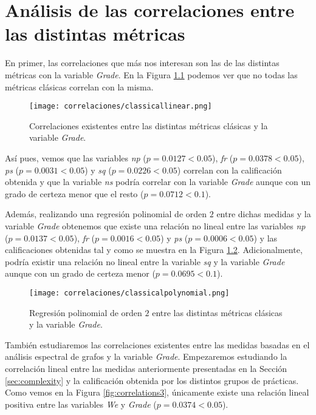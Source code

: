 \chapter{Análisis de las correlaciones entre las distintas métricas}\label{chapter:correlations}

En primer, las correlaciones que más nos interesan son las de las distintas métricas con la variable \emph{Grade}. En la Figura \ref{fig:correlations} podemos ver que no todas las métricas clásicas correlan con la misma.

\begin{figure}[H]
    \centering
    \texttt{[image: correlaciones/classicallinear.png]}
    \caption{Correlaciones existentes entre las distintas métricas clásicas y la variable \emph{Grade}.}
    \label{fig:correlations}
\end{figure}

Así pues, vemos que las variables \emph{np} ($p = 0.0127 < 0.05$), \emph{fr} ($p = 0.0378 < 0.05$), \emph{ps} ($p = 0.0031 < 0.05$) y \emph{sq} ($p = 0.0226 < 0.05$) correlan con la calificación obtenida y que la variable \emph{ns} podría correlar con la variable \emph{Grade} aunque con un grado de certeza menor que el resto ($p = 0.0712 < 0.1$).

Además, realizando una regresión polinomial de orden $2$ entre dichas medidas y la variable \emph{Grade} obtenemos que existe una relación no lineal entre las variables \emph{np} ($p = 0.0137 < 0.05$), \emph{fr} ($p = 0.0016 < 0.05$) y \emph{ps} ($p = 0.0006 < 0.05$) y las calificaciones obtenidas tal y como se muestra en la Figura \ref{fig:correlations2}. Adicionalmente, podría existir una relación no lineal entre la variable \emph{sq} y la variable \emph{Grade} aunque con un grado de certeza menor ($p = 0.0695 < 0.1$).

\begin{figure}[H]
    \centering
    \texttt{[image: correlaciones/classicalpolynomial.png]}
    \caption{Regresión polinomial de orden $2$ entre las distintas métricas clásicas y la variable \emph{Grade}.}
    \label{fig:correlations2}
\end{figure}

También estudiaremos las correlaciones existentes entre las medidas basadas en el análisis espectral de grafos y la variable \emph{Grade}. Empezaremos estudiando la correlación lineal entre las medidas anteriormente presentadas en la Sección \ref{sec:complexity} y la calificación obtenida por los distintos grupos de prácticas. Como vemos en la Figura \ref{fig:correlations3}, únicamente existe una relación lineal positiva entre las variables \emph{We} y \emph{Grade} ($p = 0.0374 < 0.05$).

